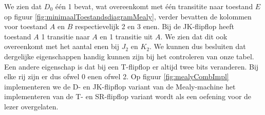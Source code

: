 \begin{table}[hbt]
\centering
{}
\caption{Implementatie van de Mealy-schakeling met verschillende soorten flipflops.}
\label{tbl:stateTableMealyCombLin}
\end{table}
We zien dat $D_0$ \'e\'en 1 bevat, wat overeenkomt met \'e\'en transitite naar toestand $E$ op figuur \ref{fig:minimaalToestandsdiagramMealy}, verder bevatten de kolommen voor toestand $A$ en $B$ respectievelijk 2 en 3 enen. Bij de JK-flipflop heeft toestand $A$ 1 transitie naar $A$ en 1 transitie uit $A$. We zien dat dit ook overeenkomt met het aantal enen bij $J_2$ en $K_2$. We kunnen dus besluiten dat dergelijke eigenschappen handig kunnen zijn bij het controleren van onze tabel. Een andere eigenschap is dat bij een T-flipflop er altijd twee bits veranderen. Bij elke rij zijn er dus ofwel 0 enen ofwel 2. Op figuur \ref{fig:mealyCombImpl} implementeren we de D- en JK-flipflop variant van de Mealy-machine het implementeren van de T- en SR-flipflop variant wordt als een oefening voor de lezer overgelaten.
